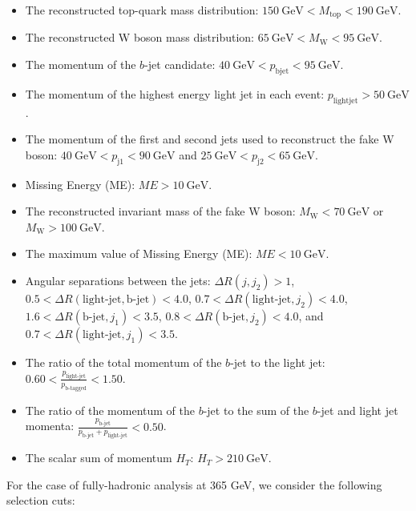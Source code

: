 \documentclass[11pt,onecolumn,english,showpacs,preprintnumbers,amsmath,amssymb,floatfix,nofootinbib]{revtex4-1}
\begin{document}
\begin{itemize}
\item The reconstructed top-quark mass distribution: $150~\text{GeV} < M_{\text{top}} < 190~\text{GeV}$.
\item The reconstructed W boson mass distribution: $65~\text{GeV} < M_{\text{W}} < 95~\text{GeV}$.
\item The momentum of the $b$-jet candidate: $40~\text{GeV} < p_{\text{bjet}} < 95~\text{GeV}$.
\item The momentum of the highest energy light jet in each event: $p_{\text{lightjet}} > 50~\text{GeV}$.
\item The momentum of the first and second jets used to reconstruct the fake W boson: $40~\text{GeV} < p_{\text{j1}} < 90~\text{GeV}$ and $25~\text{GeV} < p_{\text{j2}} < 65~\text{GeV}$.
\item Missing Energy (ME): $ME > 10~\text{GeV}$.
\item The reconstructed invariant mass of the fake W boson: $M_{\text{W}} < 70~\text{GeV}$ or $M_{\text{W}} > 100~\text{GeV}$.
\item The maximum value of Missing Energy (ME): $ME < 10~\text{GeV}$.
\item Angular separations between the jets: $\Delta R(j, j_2) > 1$, $0.5 < \Delta R(\text{light-jet}, \text{b-jet}) < 4.0$, $0.7 < \Delta R(\text{light-jet}, j_2) < 4.0$, $1.6 < \Delta R(\text{b-jet}, j_1) < 3.5$, $0.8 < \Delta R(\text{b-jet}, j_2) < 4.0$, and $0.7 < \Delta R(\text{light-jet}, j_1) < 3.5$.
\item The ratio of the total momentum of the $b$-jet to the light jet: $0.60 < \frac{p_{\text{light-jet}}}{p_{\text{b-tagged}}} < 1.50$.
\item The ratio of the momentum of the $b$-jet to the sum of the $b$-jet and light jet momenta: $\frac{p_{\text{b-jet}}}{p_{\text{b-jet}}+p_{\text{light-jet}}} < 0.50$.
\item The scalar sum of momentum $H_T$: $H_T > 210~\text{GeV}$.
\end{itemize}

For the case of fully-hadronic analysis at 365 GeV, we consider the following
selection cuts: 
\end{document}
